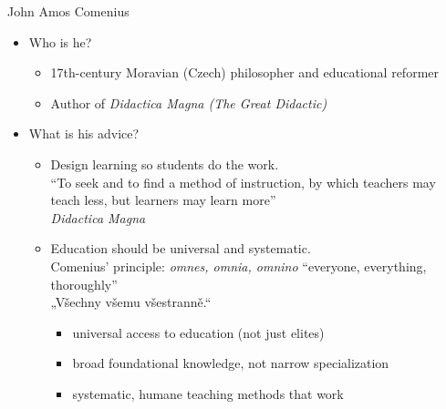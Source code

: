 \documentclass[aspectratio=169]{beamer}
\begin{document}

\begin{frame}{John Amos Comenius}
  \begin{itemize}
    \item Who is he?
      \begin{itemize}
        \item 17th-century Moravian (Czech) philosopher and educational reformer
        \item Author of \emph{Didactica Magna (The Great Didactic)}
      \end{itemize}

    \item What is his advice?
      \begin{itemize}
        \item Design learning so students do the work.\\
          ``To seek and to find a method of instruction, by which teachers
          may teach less, but learners may learn more''%
          \\ \hfill \emph{Didactica Magna} \citep[title page]{comenius:great-didactic}

        \item Education should be universal and systematic.\\
          Comenius' principle: \emph{omnes, omnia, omnino} ``everyone, everything, thoroughly''%
          \\ „Všechny všemu všestranně.“ \hfill \citep{comenius:didactica-magna}
          \begin{itemize}
            \item universal access to education (not just elites)
            \item broad foundational knowledge, not narrow specialization
            \item systematic, humane teaching methods that work
          \end{itemize}
      \end{itemize}
  \end{itemize}
\end{frame}

\end{document}
